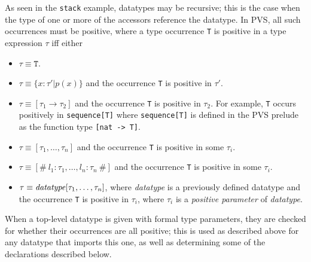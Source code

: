 As seen in the \texttt{stack} example, datatypes may be recursive; this is
the case when the type of one or more of the accessors reference the
datatype.  In PVS, all such occurrences must be positive, where a type
occurrence \texttt{T} is positive in a type expression $\tau$ iff either
\begin{itemize}
\item $\tau\equiv \texttt{T}$.

\item $\tau\equiv \{x:\tau'|p(x)\}$ and the occurrence \texttt{T} is
positive in $\tau'$.

\item $\tau\equiv [{\tau_1} \rightarrow {\tau_2}]$ and the occurrence
\texttt{T} is positive in $\tau_2$\@.  For example, \texttt{T} occurs
positively in \texttt{sequence[T]} where \texttt{sequence[T]} is defined
in the PVS prelude as the function type \texttt{[nat -> T]}\@.

\item $\tau \equiv [\tau_1,\ldots, \tau_n]$ and the occurrence \texttt{T}
is positive in some $\tau_i$.

\item $\tau\equiv [\#\ l_1 : \tau_1, \ldots, l_n : \tau_n\ \#]$ and the occurrence \texttt{T} is positive in some $\tau_i$\@. 

\item $\tau\equiv \mbox{\emph{datatype}}[\tau_1,\ldots, \tau_n]$, where
\emph{datatype} is a previously defined datatype and the occurrence
\texttt{T} is positive in $\tau_i$, where $\tau_i$ is a \emph{positive
parameter} of \emph{datatype}\@.
\end{itemize}

When a top-level datatype is given with formal type parameters, they are
checked for whether their occurrences are all positive; this is used as
described above for any datatype that imports this one, as well as
determining some of the declarations described below.

